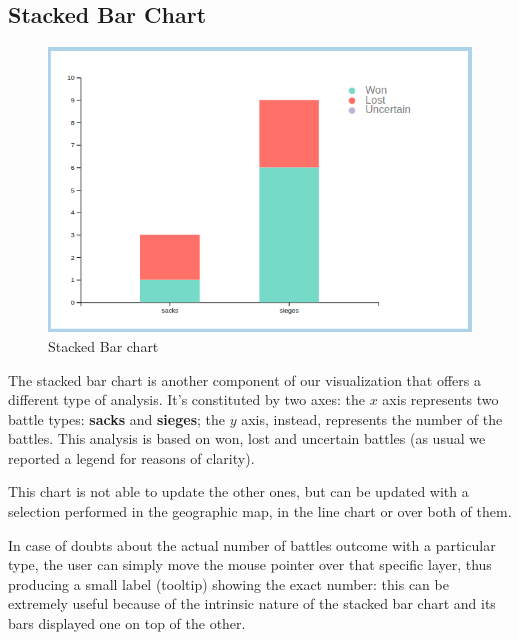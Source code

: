 \subsection{Stacked Bar Chart}
\begin{figure}[h]
    \centering
    \includegraphics[scale=0.30]{./images/stacked_bar_chart.png}
    \caption{Stacked Bar chart}
\end{figure}
The stacked bar chart is another component of our visualization that offers a different type of analysis. It's constituted by two axes: the $x$ axis represents two battle types: \textbf{sacks} and \textbf{sieges}; the $y$ axis, instead, represents the number of the battles. This analysis is based on won, lost and uncertain battles (as usual we reported a legend for reasons of clarity).

This chart is not able to update the other ones, but can be updated with a selection performed in the geographic map, in the line chart or over both of them.

In case of doubts about the actual number of battles outcome with a particular type, the user can simply move the mouse pointer over that specific layer, thus producing a small label (tooltip) showing the exact number: this can be extremely useful because of the intrinsic nature of the stacked bar chart and its bars displayed one on top of the other.


